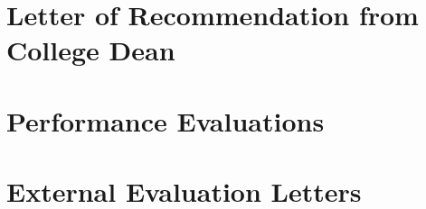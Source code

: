 \documentclass[letterpaper,12pt,times]{article}
\newcommand{\pdfscale}[0]{.7647}
\newcommand{\sectionname}[0]{}
\newcommand{\includepdfsubsec}[3]{%
  \clearpage
  \rhead{\thesection{} \sectionname, #2}

  
  
}
\renewcommand\thesection{\arabic{section}.}
\newif\ifinstr
\newcommand{\instr}[1]{
  \ifinstr
    \begin{leftbar}%
      \begin{color}{ColoradoRed}%
        \itshape
        \noindent%
        \ignorespaces%
        #1
      \end{color}
    \end{leftbar}%
  \else
  \fi
}
\begin{document}
\clearpage
\section{Letter of Recommendation from College Dean}
\rhead{\thesection{} \sectionname}

\instr{
  (This section is completed by College Dean)

  (Department Head inserts her/his letter of recommendation here)

  As directed by the Faculty Handbook, the College Dean reviews the
  application package and provides a recommendation(s) in writing to
  the appropriate University Promotion and/or Tenure Committee that is
  included here.

  In preparing this recommendation, the Dean should consider the
  criteria for tenure and/or promotion listed in the appropriate
  section of the Faculty Handbook and is encouraged to address the
  specific items listed in Section 6.5 of Academic Affairs Procedures
  Manual.
}


\clearpage
\section{Performance Evaluations}
\rhead{\thesection{} \sectionname}
%
\instr{
  Insert Faculty Evaluation Summary sheets completed by the Department
  Head for the past three most recent years.
}


\clearpage
\section{External Evaluation Letters}
\rhead{\thesection{} \sectionname}
% 

\instr{
  (Completed by Department Head)

  Include here a brief overview of the process used to solicit external
  references, define how outside referees were identified, and should include a
  copy of the generic letter used for the solicitation.

  If dossier is for promotion consideration of teaching faculty, include the
  following sentence here, ``Dossier for promotion consideration of a teaching
  faculty member, external letters are not required.'' Leave table below blank,
  and remove the page 11.
}
\end{document}

